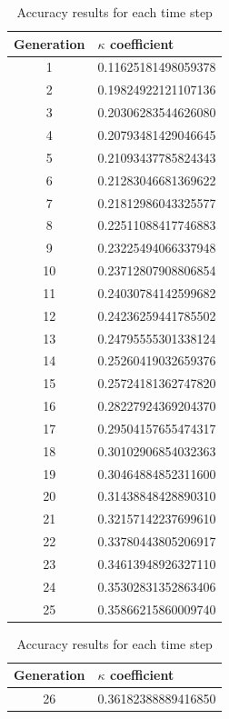 \begin{table}[H]
\setlength{\tabcolsep}{12pt}
\renewcommand{\arraystretch}{1.1}
    \caption{Accuracy results for each time step}
    \begin{minipage}{.5\linewidth}
            \begin{tabular}{@{}cl@{}}
            \toprule
            Generation & $\kappa$ coefficient \\ \midrule
            1 &  0.11625181498059378 \\
2 &  0.19824922121107136 \\
3 &  0.20306283544626080 \\
4 &  0.20793481429046645 \\
5 &  0.21093437785824343 \\
6 &  0.21283046681369622 \\
7 &  0.21812986043325577 \\
8 &  0.22511088417746883 \\
9 &  0.23225494066337948 \\
10 & 0.23712807908806854 \\
11 & 0.24030784142599682 \\
12 & 0.24236259441785502 \\
13 & 0.24795555301338124 \\
14 & 0.25260419032659376 \\
15 & 0.25724181362747820 \\
16 & 0.28227924369204370 \\
17 & 0.29504157655474317 \\
18 & 0.30102906854032363 \\
19 & 0.30464884852311600 \\
20 & 0.31438848428890310 \\
21 & 0.32157142237699610 \\
22 & 0.33780443805206917 \\
23 & 0.34613948926327110 \\
24 & 0.35302831352863406 \\
25 & 0.35866215860009740 \\ \bottomrule
        \end{tabular}
    \end{minipage}%
    \begin{minipage}{.5\linewidth}
        \begin{tabular}{@{}cl@{}}
          \toprule
          Generation & $\kappa$ coefficient \\ \midrule
          26 & 0.36182388889416850 \\

\end{tabular}
\end{minipage}
\end{table}
